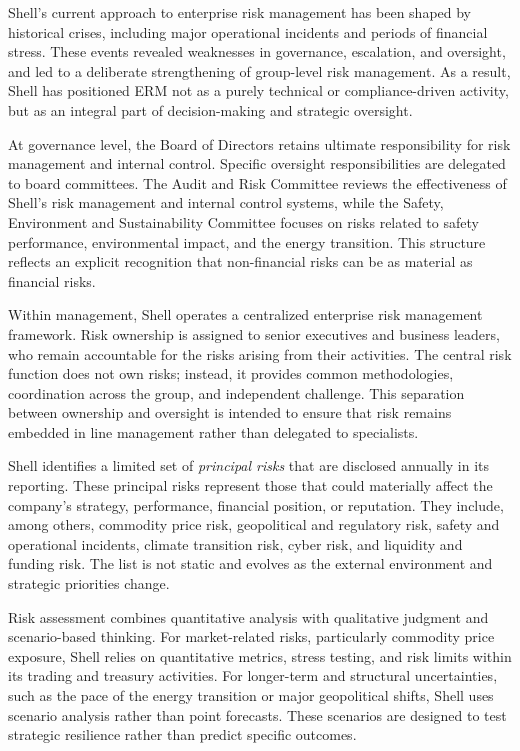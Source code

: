 \documentclass[11pt]{article}
\begin{document}
Shell’s current approach to enterprise risk management has been shaped by
historical crises, including major operational incidents and periods of
financial stress. These events revealed weaknesses in governance, escalation,
and oversight, and led to a deliberate strengthening of group-level risk
management. As a result, Shell has positioned ERM not as a purely technical or
compliance-driven activity, but as an integral part of decision-making and
strategic oversight.

At governance level, the Board of Directors retains ultimate responsibility
for risk management and internal control. Specific oversight responsibilities
are delegated to board committees. The Audit and Risk Committee reviews the
effectiveness of Shell’s risk management and internal control systems, while
the Safety, Environment and Sustainability Committee focuses on risks related
to safety performance, environmental impact, and the energy transition. This
structure reflects an explicit recognition that non-financial risks can be as
material as financial risks.

Within management, Shell operates a centralized enterprise risk management
framework. Risk ownership is assigned to senior executives and business
leaders, who remain accountable for the risks arising from their activities.
The central risk function does not own risks; instead, it provides common
methodologies, coordination across the group, and independent challenge. This
separation between ownership and oversight is intended to ensure that risk
remains embedded in line management rather than delegated to specialists.

Shell identifies a limited set of \emph{principal risks} that are disclosed
annually in its reporting. These principal risks represent those that could
materially affect the company’s strategy, performance, financial position, or
reputation. They include, among others, commodity price risk, geopolitical and
regulatory risk, safety and operational incidents, climate transition risk,
cyber risk, and liquidity and funding risk. The list is not static and evolves
as the external environment and strategic priorities change.

Risk assessment combines quantitative analysis with qualitative judgment and
scenario-based thinking. For market-related risks, particularly commodity
price exposure, Shell relies on quantitative metrics, stress testing, and
risk limits within its trading and treasury activities. For longer-term and
structural uncertainties, such as the pace of the energy transition or major
geopolitical shifts, Shell uses scenario analysis rather than point forecasts.
These scenarios are designed to test strategic resilience rather than predict
specific outcomes.
\end{document}
